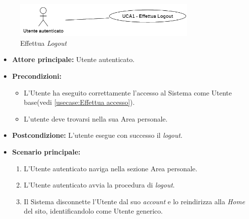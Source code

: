 \newpage
{}
\label{usecase:Effettua Logout}

\begin{figure}[h]
	\centering
	\includegraphics[width=0.8\textwidth]{./uml/UCA1.png} 
	\caption{Effettua \textit{Logout}}
	\label{fig:UCA1}
  \end{figure}

\begin{itemize}
	\item \textbf{Attore principale:} Utente autenticato.

	\item \textbf{Precondizioni:}
	\begin{itemize}
        \item L'Utente ha eseguito correttamente l'accesso al Sistema come Utente base(vedi \autoref{usecase:Effettua accesso}).
        \item L'utente deve trovarsi nella sua Area personale.
    \end{itemize}

	\item \textbf{Postcondizione:} L'utente esegue con successo il \textit{logout}.

	\item \textbf{Scenario principale:}
	      \begin{enumerate}
		      \item L'Utente autenticato naviga nella sezione Area personale.
		      \item L'Utente autenticato avvia la procedura di \textit{logout}.
              \item Il Sistema disconnette l'Utente dal suo \textit{account} e lo reindirizza alla \textit{Home} del sito, identificandolo come Utente generico.
	      \end{enumerate}
\end{itemize}
